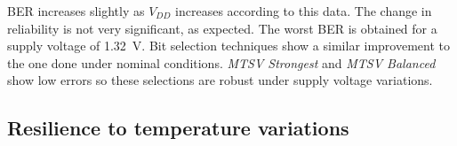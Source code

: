 \begin{table}[H]
  \centering
  \caption{Mean BER value for the different selections when performing 200 power-ups under supply voltage variations}
  \label{tab:vdd_sel}%
\end{table}%

BER increases slightly as $V_{DD}$ increases according to this data. The change in reliability is not very significant, as expected. The worst BER is obtained for a supply voltage of \SI{1.32}{V}. Bit selection techniques show a similar improvement to the one done under nominal conditions. \textit{MTSV Strongest} and \textit{MTSV Balanced} show low errors so these selections are robust under supply voltage variations. 



\subsection{Resilience to temperature variations}

\begin{table}[b]
\small
  \centering
  \caption{Mean BER value for the different selections when performing 200 power-ups under temperature variations}
  \label{tab:temp_sel}%
\end{table}%

